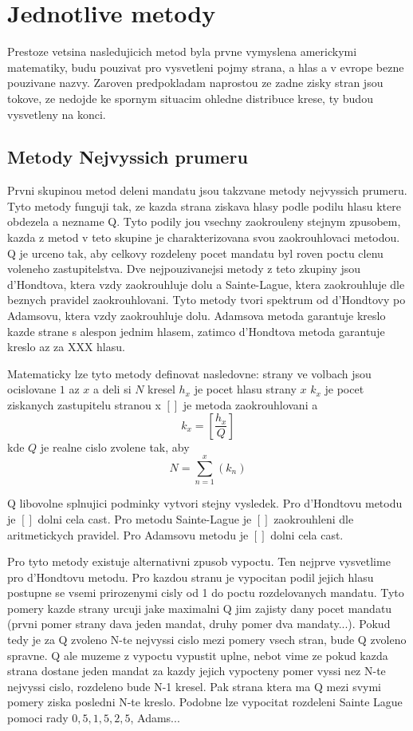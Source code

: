 \documentclass[12pt,a4paper]{article}
\begin{document}
\section{Jednotlive metody}
Prestoze vetsina nasledujicich metod byla prvne vymyslena americkymi matematiky, budu pouzivat pro vysvetleni pojmy strana, a hlas a v evrope bezne pouzivane nazvy.
Zaroven predpokladam naprostou ze zadne zisky stran jsou tokove, ze nedojde ke spornym situacim ohledne distribuce krese, ty budou vysvetleny na konci. 

\subsection{Metody Nejvyssich prumeru}
Prvni skupinou metod deleni mandatu jsou takzvane metody nejvyssich prumeru.
Tyto metody funguji tak, ze kazda strana ziskava hlasy podle podilu hlasu ktere obdezela a nezname Q.
Tyto podily jou vsechny zaokrouleny stejnym zpusobem, kazda z metod v teto skupine je charakterizovana svou zaokrouhlovaci metodou.
Q je urceno tak, aby celkovy rozdeleny pocet mandatu byl roven poctu clenu voleneho zastupitelstva.
Dve nejpouzivanejsi metody z teto zkupiny jsou d'Hondtova, ktera vzdy zaokrouhluje dolu a Sainte-Lague, ktera zaokrouhluje dle beznych pravidel zaokrouhlovani.
Tyto metody tvori spektrum od d'Hondtovy po Adamsovu, ktera vzdy zaokrouhluje dolu.
Adamsova metoda garantuje kreslo kazde strane s alespon jednim hlasem, zatimco d'Hondtova metoda garantuje kreslo az za XXX hlasu.

Matematicky lze tyto metody definovat nasledovne:
strany ve volbach jsou ocislovane $1$ az $x$ a deli si $N$ kresel
$h_{x}$ je pocet hlasu strany $x$
$k_{x}$ je pocet ziskanych zastupitelu stranou x
$[]$ je metoda zaokrouhlovani
a
$$k_{x}=[\dfrac{h_{x}}{Q}]$$ kde $Q$ je realne cislo zvolene tak, aby $$N=\sum_{n=1}^{x} (k_{n})$$ 

Q libovolne splnujici podminky vytvori stejny vysledek. %
Pro d'Hondtovu metodu je $[]$ dolni cela cast.
Pro metodu Sainte-Lague je $[]$ zaokrouhleni dle aritmetickych pravidel.
Pro Adamsovu metodu je $[]$ dolni cela cast.

Pro tyto metody existuje alternativni zpusob vypoctu.
Ten nejprve vysvetlime pro d'Hondtovu metodu.
Pro kazdou stranu je vypocitan podil jejich hlasu postupne se vsemi prirozenymi cisly od 1 do poctu rozdelovanych mandatu.
Tyto pomery kazde strany urcuji jake maximalni Q jim zajisty dany pocet mandatu (prvni pomer strany dava jeden mandat, druhy pomer dva mandaty...).
Pokud tedy je za Q zvoleno N-te nejvyssi cislo mezi pomery vsech stran, bude Q zvoleno spravne.
Q ale muzeme z vypoctu vypustit uplne, nebot vime ze pokud kazda strana dostane jeden mandat za kazdy jejich vypocteny pomer vyssi nez N-te nejvyssi cislo, rozdeleno bude N-1 kresel.
Pak strana ktera ma Q mezi svymi pomery ziska posledni N-te kreslo.
Podobne lze vypocitat rozdeleni Sainte Lague pomoci rady $0{,}5, 1{,}5, 2{,}5$, Adams... %
\end{document}
